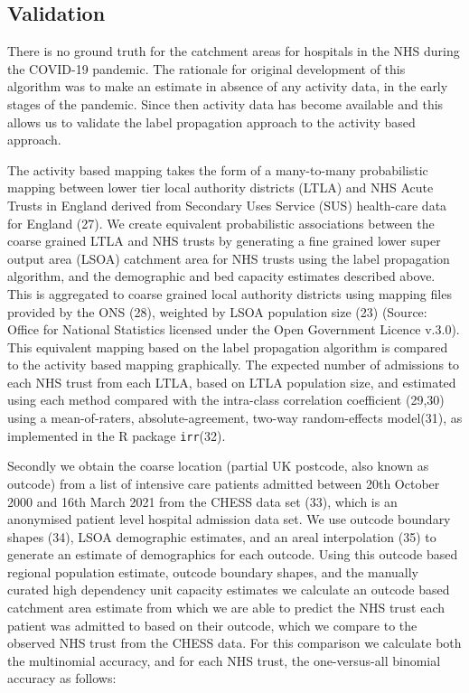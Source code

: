 \documentclass[
]{article}
\begin{document}
\hypertarget{validation}{%
\subsection{Validation}\label{validation}}

There is no ground truth for the catchment areas for hospitals in the
NHS during the COVID-19 pandemic. The rationale for original development
of this algorithm was to make an estimate in absence of any activity
data, in the early stages of the pandemic. Since then activity data has
become available and this allows us to validate the label propagation
approach to the activity based approach.

The activity based mapping takes the form of a many-to-many
probabilistic mapping between lower tier local authority districts
(LTLA) and NHS Acute Trusts in England derived from Secondary Uses
Service (SUS) health-care data for England (27). We create equivalent
probabilistic associations between the coarse grained LTLA and NHS
trusts by generating a fine grained lower super output area (LSOA)
catchment area for NHS trusts using the label propagation algorithm, and
the demographic and bed capacity estimates described above. This is
aggregated to coarse grained local authority districts using mapping
files provided by the ONS (28), weighted by LSOA population size (23)
(Source: Office for National Statistics licensed under the Open
Government Licence v.3.0). This equivalent mapping based on the label
propagation algorithm is compared to the activity based mapping
graphically. The expected number of admissions to each NHS trust from
each LTLA, based on LTLA population size, and estimated using each
method compared with the intra-class correlation coefficient (29,30)
using a mean-of-raters, absolute-agreement, two-way random-effects
model(31), as implemented in the R package \texttt{irr}(32).

Secondly we obtain the coarse location (partial UK postcode, also known
as outcode) from a list of intensive care patients admitted between 20th
October 2000 and 16th March 2021 from the CHESS data set (33), which is
an anonymised patient level hospital admission data set. We use outcode
boundary shapes (34), LSOA demographic estimates, and an areal
interpolation (35) to generate an estimate of demographics for each
outcode. Using this outcode based regional population estimate, outcode
boundary shapes, and the manually curated high dependency unit capacity
estimates we calculate an outcode based catchment area estimate from
which we are able to predict the NHS trust each patient was admitted to
based on their outcode, which we compare to the observed NHS trust from
the CHESS data. For this comparison we calculate both the multinomial
accuracy, and for each NHS trust, the one-versus-all binomial accuracy
as follows:
\end{document}

